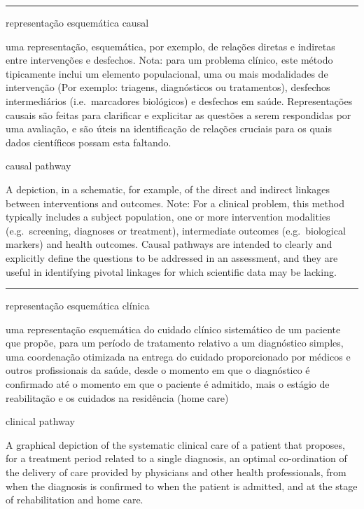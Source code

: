 \documentclass[
  openany]{book}
\begin{document}
\begin{center}\rule{0.5\linewidth}{0.5pt}\end{center}

representação esquemática causal

uma representação, esquemática, por exemplo, de relações diretas e indiretas entre intervenções e desfechos. Nota: para um problema clínico, este método tipicamente inclui um elemento populacional, uma ou mais modalidades de intervenção (Por exemplo: triagens, diagnósticos ou tratamentos), desfechos intermediários (i.e.~marcadores biológicos) e desfechos em saúde. Representações causais são feitas para clarificar e explicitar as questões a serem respondidas por uma avaliação, e são úteis na identificação de relações cruciais para os quais dados científicos possam esta faltando.

causal pathway

A depiction, in a schematic, for example, of the direct and indirect linkages between interventions and outcomes. Note: For a clinical problem, this method typically includes a subject population, one or more intervention modalities (e.g.~screening, diagnoses or treatment), intermediate outcomes (e.g.~biological markers) and health outcomes. Causal pathways are intended to clearly and explicitly define the questions to be addressed in an assessment, and they are useful in identifying pivotal linkages for which scientific data may be lacking.

\begin{center}\rule{0.5\linewidth}{0.5pt}\end{center}

representação esquemática clínica

uma representação esquemática do cuidado clínico sistemático de um paciente que propõe, para um período de tratamento relativo a um diagnóstico simples, uma coordenação otimizada na entrega do cuidado proporcionado por médicos e outros profissionais da saúde, desde o momento em que o diagnóstico é confirmado até o momento em que o paciente é admitido, mais o estágio de reabilitação e os cuidados na residência (home care)

clinical pathway

A graphical depiction of the systematic clinical care of a patient that proposes, for a treatment period related to a single diagnosis, an optimal co-ordination of the delivery of care provided by physicians and other health professionals, from when the diagnosis is confirmed to when the patient is admitted, and at the stage of rehabilitation and home care.
\end{document}
